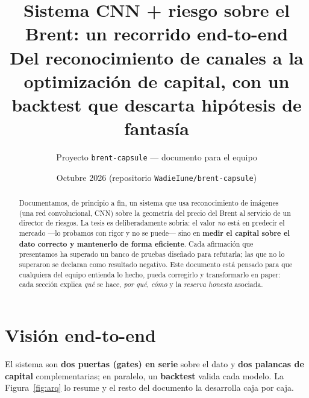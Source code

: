\documentclass[11pt,a4paper]{article}
\title{\vspace{-1.2cm}\textbf{Sistema CNN + riesgo sobre el Brent: un recorrido
end-to-end}\\[2pt]\large Del reconocimiento de canales a la optimización de
capital, con un backtest que descarta hipótesis de fantasía}
\author{Proyecto \texttt{brent-capsule} --- documento para el equipo}
\date{Octubre 2026 \quad(repositorio \texttt{WadieIune/brent-capsule})}
\begin{document}
\maketitle
\vspace{-0.6cm}

\begin{abstract}\noindent
Documentamos, de principio a fin, un sistema que usa reconocimiento de imágenes
(una red convolucional, CNN) sobre la geometría del precio del Brent al servicio
de un director de riesgos. La tesis es deliberadamente sobria: el valor \emph{no}
está en predecir el mercado ---lo probamos con rigor y no se puede--- sino en
\textbf{medir el capital sobre el dato correcto y mantenerlo de forma eficiente}.
Cada afirmación que presentamos ha superado un banco de pruebas diseñado para
refutarla; las que no lo superaron se declaran como resultado negativo. Este
documento está pensado para que cualquiera del equipo entienda lo hecho, pueda
corregirlo y transformarlo en paper: cada sección explica \emph{qué} se hace,
\emph{por qué}, \emph{cómo} y la \emph{reserva honesta} asociada.
\end{abstract}

\tableofcontents
\vspace{3mm}

\section{Visión end-to-end}
El sistema son \textbf{dos puertas (gates) en serie} sobre el dato y \textbf{dos
palancas de capital} complementarias; en paralelo, un \textbf{backtest} valida
cada modelo. La Figura~\ref{fig:arq} lo resume y el resto del documento la
desarrolla caja por caja.
\end{document}
